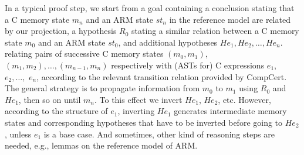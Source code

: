 In a typical proof step, 
we start from a goal containing 
a conclusion stating that 
a C memory state $m_n$ and an ARM state $st_n$ in the reference model 
are related by our projection,
a hypothesis $R_0$ stating a similar relation between 
a C memory state $m_0$ and an ARM state $st_0$,
and additional hypotheses $He_1, He_2, \ldots, He_n$.
relating pairs of successive C memory states 
$(m_0, m_1)$, $(m_1, m_2), \ldots, (m_{n-1}, m_n)$
respectively with (ASTs for) C expressions $e_1$, $e_2, \ldots,$ $e_n$,
according to the relevant transition relation provided by CompCert.
The general strategy is to propagate information
from $m_0$ to $m_1$ using $R_0$ and $He_1$, 
then so on until $m_n$.
To this effect we invert $He_1$, $He_2$, etc.
However, according to the structure of $e_1$, 
inverting $He_1$ generates intermediate memory states
and corresponding hypotheses that have to be inverted before 
going to $He_2$, unless $e_1$ is a base case.
And sometimes, other kind of reasoning steps are needed,
e.g., lemmas on the reference model of ARM.





